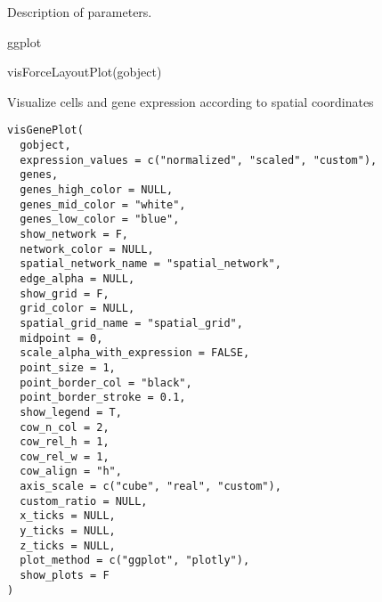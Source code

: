 \documentclass[a4paper]{book}
\begin{document}
%
\begin{Details}\relax
Description of parameters.
\end{Details}
%
\begin{Value}
ggplot
\end{Value}
%
\begin{Examples}
\begin{ExampleCode}
    visForceLayoutPlot(gobject)
\end{ExampleCode}
\end{Examples}
%
\begin{Description}\relax
Visualize cells and gene expression according to spatial coordinates
\end{Description}
%
\begin{Usage}
\begin{verbatim}
visGenePlot(
  gobject,
  expression_values = c("normalized", "scaled", "custom"),
  genes,
  genes_high_color = NULL,
  genes_mid_color = "white",
  genes_low_color = "blue",
  show_network = F,
  network_color = NULL,
  spatial_network_name = "spatial_network",
  edge_alpha = NULL,
  show_grid = F,
  grid_color = NULL,
  spatial_grid_name = "spatial_grid",
  midpoint = 0,
  scale_alpha_with_expression = FALSE,
  point_size = 1,
  point_border_col = "black",
  point_border_stroke = 0.1,
  show_legend = T,
  cow_n_col = 2,
  cow_rel_h = 1,
  cow_rel_w = 1,
  cow_align = "h",
  axis_scale = c("cube", "real", "custom"),
  custom_ratio = NULL,
  x_ticks = NULL,
  y_ticks = NULL,
  z_ticks = NULL,
  plot_method = c("ggplot", "plotly"),
  show_plots = F
)
\end{verbatim}
\end{Usage}
%
\end{document}
